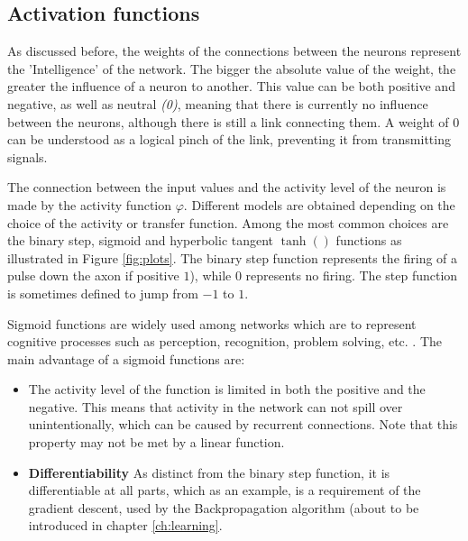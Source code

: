 \documentclass[10pt,a4paper,DIV=11]{scrreprt}
\begin{document}
\subsection{Activation functions}

As discussed before, the weights of the connections between the neurons represent the 'Intelligence' of the network. The bigger the absolute 
value of the weight, the greater the influence of a neuron to another. This value can be both positive and negative, as well as 
neutral \textit{(0)}, meaning that there is currently no influence between the neurons, although there is still a link connecting them. 
A weight of 0 can be understood as a logical pinch of the link, preventing it from transmitting signals.


The connection between the input values and the activity level of the neuron is made by the activity function $\varphi$. Different models are 
obtained depending on the choice of the activity or transfer function. Among the most common choices are the binary step, 
sigmoid and hyperbolic tangent $\tanh()$ functions as illustrated in Figure \ref{fig:plots}. The binary step function represents the firing of a pulse down the axon 
if positive $1$), while $0$ represents no firing. The step function is sometimes defined to jump from $-1$ to $1$. 

Sigmoid functions are widely used among networks which are to represent cognitive processes such as perception, recognition, problem solving, 
etc. . %
The main advantage of a sigmoid functions are:

\begin{itemize}
\item The activity level of the function is limited in both the positive and the negative. This means that activity in the network can not spill 
over unintentionally, which can be caused by recurrent connections. Note that this property may not be met by a linear function.
\item \textbf{Differentiability}
As distinct from the binary step function, it is differentiable at all parts, which as an example, is a requirement of the gradient descent,
used by the Backpropagation algorithm (about to be introduced in chapter \ref{ch:learning}.
\end{itemize}
\end{document}
